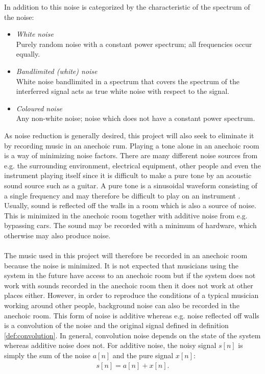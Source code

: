 In addition to this noise is categorized by the characteristic of the spectrum of the noise:
\begin{itemize}
\item \textit{White noise}\\
Purely random noise with a constant power spectrum; all frequencies occur equally.
\item \textit{Bandlimited (white) noise}\\
White noise bandlimited in a spectrum that covers the spectrum of the interferred signal acts as true white noise with respect to the signal.
\item \textit{Coloured noise}\\
Any non-white noise; noise which does not have a constant power spectrum.
\end{itemize}

As noise reduction is generally desired, this project will also seek to eliminate it by recording music in an anechoic rum. Playing a tone alone in an anechoic room is a way of minimizing noise factors. There are many different noise sources from e.g. the surrounding environment, electrical equipment, other people and even the instrument playing itself since it is difficult to make a pure tone by an acoustic sound source such as a guitar. A pure tone is a sinusoidal waveform consisting of a single frequency and may therefore be difficult to play on an instrument \cite{AcousticNoise}. Usually, sound is reflected off the walls in a room which is also a source of noise. This is minimized in the anechoic room together with additive noise from e.g. bypassing cars. The sound may be recorded with a minimum of hardware, which otherwise may also produce noise.
\\ \\
The music used in this project will therefore be recorded in an anechoic room because the noise is minimized. 
It is not expected that musicians using the system in the future have access to an anechoic room but if the system does not work with sounds recorded in the anechoic room then it does not work at other places either. However, in order to reproduce the conditions of a typical musician working around other people, background noise can also be recorded in the anechoic room. This form of noise is additive whereas e.g. noise reflected off walls is a convolution of the noise and the original signal defined in definition \ref{def:convolution}. In general, convolution noise depends on the state of the system whereas additive noise does not. For additive noise, the noisy signal $s[n]$ is simply the sum of the noise $a[n]$ and the pure signal $x[n]$:
\begin{align*}
s[n] = a[n] + x[n].
\end{align*}


